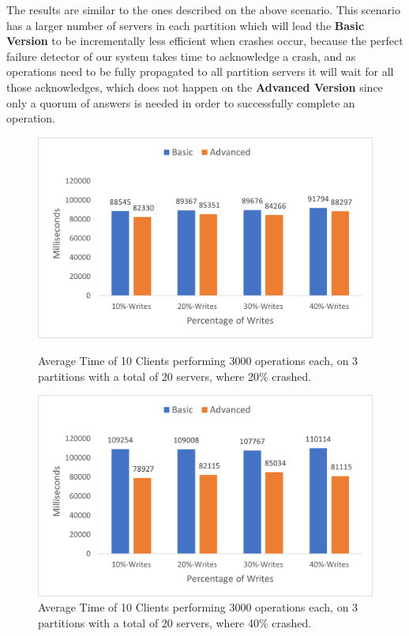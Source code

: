 \documentclass[times, 10pt,twocolumn]{article}
\begin{document}
The results are similar to the ones described on the above scenario. This scenario has a larger number of servers in each partition which will lead the \textbf{Basic Version} to be incrementally less efficient when crashes occur, because the perfect failure detector of our system takes time to acknowledge a crash, and as operations need to be fully propagated to all partition servers it will wait for all those acknowledges, which does not happen on the \textbf{Advanced Version} since only a quorum of answers is needed in order to successfully complete an operation.
\begin{figure}[h!]
	\centering
	\includegraphics[scale=0.65]{Graphs/Client-20-20.png}
	\caption{Average Time of 10 Clients performing 3000 operations each, on 3 partitions with a total of 20 servers, where 20\% crashed.}
	\vspace{0.15in}
	\centering
	\includegraphics[scale=0.65]{Graphs/Client-20-40.png}
	\caption{Average Time of 10 Clients performing 3000 operations each, on 3 partitions with a total of 20 servers, where 40\% crashed.}
\end{figure}
\end{document}
